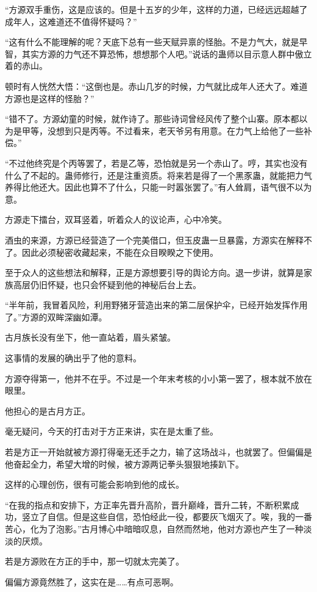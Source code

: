 \begin{this_body}
“方源双手重伤，这是应该的。但是十五岁的少年，这样的力道，已经远远超越了成年人，这难道还不值得怀疑吗？”

“这有什么不能理解的呢？天底下总有一些天赋异禀的怪胎。不是力气大，就是早智，其实方源的力气还不算恐怖，想想那个人吧。”说话的蛊师以目示意人群中傲立着的赤山。

顿时有人恍然大悟：“这倒也是。赤山几岁的时候，力气就比成年人还大了。难道方源也是这样的怪胎？”

“错不了。方源幼童的时候，就作诗了。那些诗词曾经风传了整个山寨。原本都以为是甲等，没想到只是丙等。不过看来，老天爷另有用意。在力气上给他了一些补偿。”

“不过他终究是个丙等罢了，若是乙等，恐怕就是另一个赤山了。哼，其实也没有什么了不起的。蛊师修行，还是注重资质。将来若是得了一个黑豕蛊，就能把力气养得比他还大。因此也算不了什么，只能一时嚣张罢了。”有人耸肩，语气很不以为意。

方源走下擂台，双耳竖着，听着众人的议论声，心中冷笑。

酒虫的来源，方源已经营造了一个完美借口，但玉皮蛊一旦暴露，方源实在解释不了。因此必须秘密收藏起来，不能在众目睽睽之下使用。

至于众人的这些想法和解释，正是方源想要引导的舆论方向。退一步讲，就算是家族高层仍旧怀疑，也只会怀疑到他的神秘后台上去。

“半年前，我冒着风险，利用野猪牙营造出来的第二层保护伞，已经开始发挥作用了。”方源的双眸深幽如潭。

古月族长没有坐下，他一直站着，眉头紧皱。

这事情的发展的确出乎了他的意料。

方源夺得第一，他并不在乎。不过是一个年末考核的小小第一罢了，根本就不放在眼里。

他担心的是古月方正。

毫无疑问，今天的打击对于方正来讲，实在是太重了些。

若是方正一开始就被方源打得毫无还手之力，输了这场战斗，也就罢了。但偏偏是他奋起全力，希望大增的时候，被方源两记拳头狠狠地揍趴下。

这样的心理创伤，很有可能会影响到他的成长。

“在我的指点和安排下，方正率先晋升高阶，晋升巅峰，晋升二转，不断积累成功，竖立了自信。但是这些自信，恐怕经此一役，都要灰飞烟灭了。唉，我的一番苦心，化为了泡影。”古月博心中暗暗叹息，自然而然地，他对方源也产生了一种淡淡的厌烦。

若是方源败在方正的手中，那一切就太完美了。

偏偏方源竟然胜了，这实在是……有点可恶啊。


\end{this_body}
